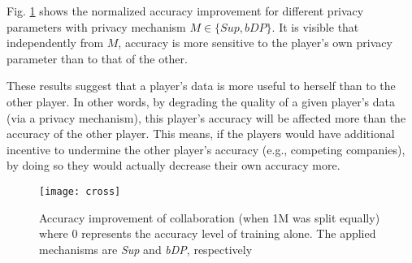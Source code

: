 \documentclass[USenglish,oneside,twocolumn]{article}
\theoremstyle{plain}
\begin{document}
    Fig. \ref{fig:cross} shows the normalized accuracy improvement  for different privacy parameters with privacy mechanism $M\in\{Sup,bDP\}$. It is visible that independently from $M$, accuracy is more sensitive to the player's own privacy parameter than to that of the other.
    
    These results suggest that a player's data is more useful to herself than to the other player. In other words, by degrading the quality of a given player's data (via a privacy mechanism), this player's accuracy will be affected more than the accuracy of the other player. This means, if the players would have additional incentive to undermine the other player's accuracy (e.g., competing companies), by doing so they would actually decrease their own accuracy more.
    
    \vspace{-0.25cm}
    \begin{figure}[h]
        \centering
        \texttt{[image: cross]}
        \caption{Accuracy improvement of collaboration (when 1M was split equally) where 0 represents the accuracy level of training alone. The applied mechanisms are \textit{Sup} and \textit{bDP}, respectively}
        \label{fig:cross}
    \end{figure}
    \vspace{-0.0cm}
    
    
\end{document}
